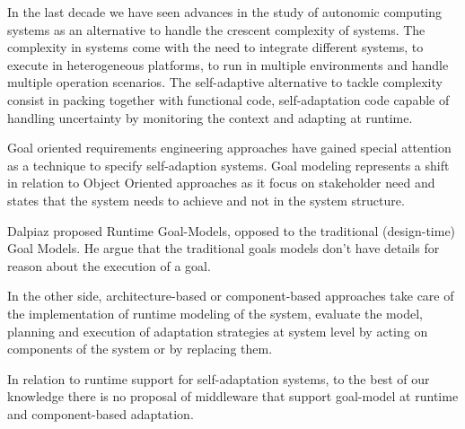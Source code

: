 In the last decade we have seen advances in the study of autonomic computing systems as an alternative to handle the crescent complexity of systems. The complexity in systems come with the need to integrate different systems, to execute in heterogeneous platforms, to run in multiple environments and handle multiple operation scenarios. The self-adaptive alternative to tackle complexity consist in packing together with functional code, self-adaptation code capable of handling uncertainty by monitoring the context and adapting at runtime.




Goal oriented requirements engineering approaches have gained special attention as a technique to specify self-adaption systems. Goal modeling represents a shift in relation to Object Oriented approaches as it focus on stakeholder need and states that the system needs to achieve and not in the system structure. \cite{ali_goal-based_2010}

Dalpiaz proposed Runtime Goal-Models, opposed to the traditional (design-time) Goal Models. He argue that the traditional goals models don't have details for reason about the execution of a goal. \cite{dalpiaz_runtime_2013} %

In the other side, architecture-based or component-based approaches take care of the implementation of runtime modeling of the system, evaluate the model, planning and execution of adaptation strategies at system level by acting on components of the system or by replacing them. \cite{garlan_software_2009}





In relation to runtime support for self-adaptation systems, to the best of our knowledge there is no proposal of middleware that support goal-model at runtime and component-based adaptation.
